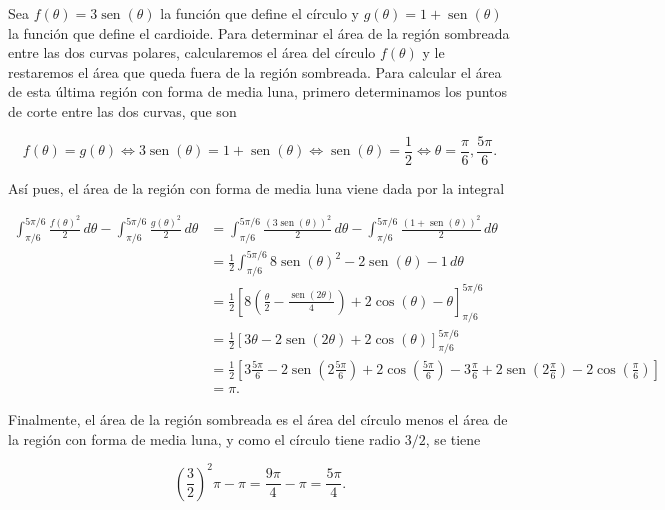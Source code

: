 \documentclass[
  spanish,
  a4paper,
]{scrreport}
\theoremstyle{definition}
\theoremstyle{remark}
\begin{document}
\begin{tcolorbox}[enhanced jigsaw, arc=.35mm, bottomrule=.15mm, bottomtitle=1mm, breakable, colback=white, colbacktitle=quarto-callout-tip-color!10!white, colframe=quarto-callout-tip-color-frame, coltitle=black, left=2mm, leftrule=.75mm, opacityback=0, opacitybacktitle=0.6, rightrule=.15mm, title=\textcolor{quarto-callout-tip-color}{\faLightbulb}\hspace{0.5em}{Solución}, titlerule=0mm, toprule=.15mm, toptitle=1mm]

Sea \(f(\theta) = 3\operatorname{sen}(\theta)\) la función que define el
círculo y \(g(\theta) = 1+\operatorname{sen}(\theta)\) la función que
define el cardioide. Para determinar el área de la región sombreada
entre las dos curvas polares, calcularemos el área del círculo
\(f(\theta)\) y le restaremos el área que queda fuera de la región
sombreada. Para calcular el área de esta última región con forma de
media luna, primero determinamos los puntos de corte entre las dos
curvas, que son

\[
f(\theta) = g(\theta) \Leftrightarrow 3\operatorname{sen}(\theta) = 1+\operatorname{sen}(\theta) \Leftrightarrow \operatorname{sen}(\theta) = \frac{1}{2} \Leftrightarrow \theta = \frac{\pi}{6}, \frac{5\pi}{6}.
\]

Así pues, el área de la región con forma de media luna viene dada por la
integral

\begin{align*}
\int_{\pi/6}^{5\pi/6} \frac{f(\theta)^2}{2}\,d\theta - \int_{\pi/6}^{5\pi/6} \frac{g(\theta)^2}{2}\,d\theta &=
\int_{\pi/6}^{5\pi/6} \frac{(3\operatorname{sen}(\theta))^2}{2}\,d\theta - \int_{\pi/6}^{5\pi/6} \frac{(1+\operatorname{sen}(\theta))^2}{2}\,d\theta \\
&= \frac{1}{2}\int_{\pi/6}^{5\pi/6} 8\operatorname{sen}(\theta)^2 -2\operatorname{sen}(\theta) -1 \,d\theta\\
&= \frac{1}{2}\left[8\left(\frac{\theta}{2}-\frac{\operatorname{sen}(2\theta)}{4}\right)+2\cos(\theta)-\theta\right]_{\pi/6}^{5\pi/6}\\
&= \frac{1}{2}\left[3\theta - 2\operatorname{sen}(2\theta) +2\cos(\theta)\right]_{\pi/6}^{5\pi/6}\\
&= \frac{1}{2}\left[3\frac{5\pi}{6} - 2\operatorname{sen}\left(2\frac{5\pi}{6}\right) +2\cos\left(\frac{5\pi}{6}\right) - 3\frac{\pi}{6} + 2\operatorname{sen}\left(2\frac{\pi}{6}\right) -2\cos\left(\frac{\pi}{6}\right)\right]\\
&= \pi.
\end{align*}

Finalmente, el área de la región sombreada es el área del círculo menos
el área de la región con forma de media luna, y como el círculo tiene
radio \(3/2\), se tiene

\[
\left(\frac{3}{2}\right)^2\pi-\pi = \frac{9\pi}{4}-\pi = \frac{5\pi}{4}.
\]

\end{tcolorbox}
\end{document}
